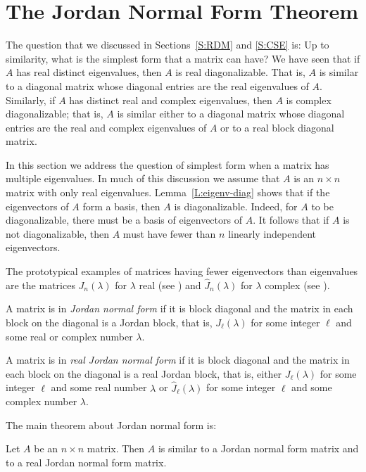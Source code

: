 \section{The Jordan Normal Form Theorem}
\label{S:JNF}

The question that we discussed in Sections~\ref{S:RDM} and \ref{S:CSE} is: 
Up to similarity, what is the simplest form that a matrix can have?  
We have seen that if $A$ has real distinct eigenvalues, then $A$ is real 
diagonalizable.  That is, $A$ is similar to a diagonal matrix whose 
diagonal entries are the real eigenvalues of $A$.  Similarly, if $A$ has 
distinct real and complex eigenvalues, then $A$ is complex diagonalizable; 
that is, $A$ is similar either to a diagonal matrix whose diagonal entries 
are the real and complex eigenvalues of $A$ or to a real block diagonal 
matrix.

In this section we address the question of simplest form when a
matrix has multiple eigenvalues.  In much of this discussion we assume
that $A$ is an $n\times n$ matrix with only real eigenvalues.  
Lemma~\ref{L:eigenv-diag} shows that if the eigenvectors of 
$A$ form a basis, then $A$ is diagonalizable. Indeed, for $A$ to be
diagonalizable, there must be a basis of eigenvectors of $A$.  It 
follows that if $A$ is not diagonalizable, then $A$ must have fewer
than $n$ linearly independent 
eigenvectors.  

The prototypical examples of matrices having fewer eigenvectors than 
eigenvalues are the matrices $J_n(\lambda)$ for $\lambda$ real (see
) and $\widehat{J}_n(\lambda)$ for $\lambda$ complex (see
).
\begin{Def} 
A matrix is in {\em Jordan normal form\/} if it is block diagonal and 
the matrix in each block on the diagonal is a Jordan block, that is, 
$J_\ell(\lambda)$ for some integer $\ell$ and some real or complex number 
$\lambda$.  

A matrix is in {\em real Jordan normal form\/} if it is block diagonal 
and the matrix in each block on the diagonal is a real Jordan block, that is, 
either $J_\ell(\lambda)$ for some integer $\ell$ and some real number 
$\lambda$ or $\widehat{J}_\ell(\lambda)$ for some integer $\ell$ and some 
complex number $\lambda$. 
\end{Def} 


The main theorem about Jordan normal form is:
\begin{thm} \label{T:Jordan}
Let $A$ be an $n\times n$ matrix.  Then $A$ is 
similar to a Jordan normal
form matrix and to a real Jordan normal form matrix.
\end{thm}

